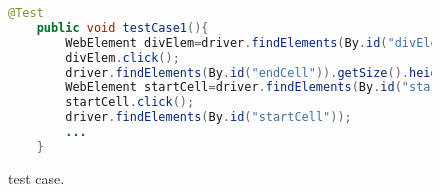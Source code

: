 \begin{figure}
\begin{lstlisting}[language=Java]
	@Test
	public void testCase1(){
		WebElement divElem=driver.findElements(By.id("divElem"));
		divElem.click();
		driver.findElements(By.id("endCell")).getSize().height;
		WebElement startCell=driver.findElements(By.id("startCell"));
		startCell.click();
		driver.findElements(By.id("startCell"));
		...
	}
\end{lstlisting}
\vspace{-0.1in} 

\caption{\selenium test case.}
\label{Fig:domTestExample}
\vspace{-0.2in} 
\end{figure}